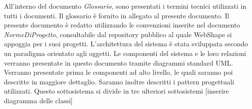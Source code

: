All'interno del documento \textit{Glossario}, sono presentati i termini tecnici utilizzati in tutti i documenti. Il glossario \`e fornito in allegato al presente documento.
Il presente documento \`e redatto utilizzando le convenzioni inserite nel documento \textit{NormeDiProgetto}, consultabile dal repository pubblico al quale WebShape si appoggia per i suoi progetti.
L'architettura del sistema \`e stata sviluppata secondo un paradigma orientato agli oggetti. Le componenti del sistema e le loro relazioni verranno presentate in questo documento tramite diagrammi standard UML. Verranno presentate prima le componenti ad alto livello, le quali saranno poi descritte in maggiore dettaglio. Saranno inoltre descritti i pattern progettuali utilizzati.
Questo sottosistema si divide in tre ulteriori sottosistemi
[inserire diagramma delle classi] \\
